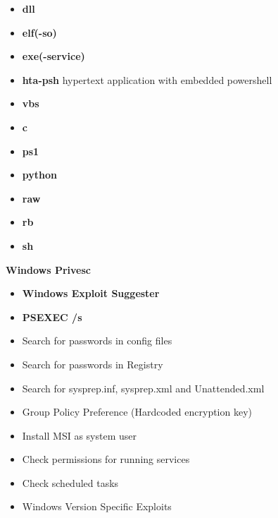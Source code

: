 \documentclass[a4paper,10pt]{article}
\begin{document}
\begin{multicols}{2}
\begin{tcolorbox}[breakable,title=Payload Generation]
\begin{itemize}
	\item \textbf{dll}
	\item \textbf{elf(-so)}
	\item \textbf{exe(-service)}
	\item \textbf{hta-psh} hypertext application with embedded powershell
	\item \textbf{vbs}
	\item \textbf{c}
	\item \textbf{ps1}
	\item \textbf{python}
	\item \textbf{raw}
	\item \textbf{rb}
	\item \textbf{sh}
\end{itemize}
\end{tcolorbox}
\end{multicols}
\newpage
\Huge{\textbf{Windows Privesc}}
\newline
\normalsize
\begin{tcolorbox}[breakable,title=Generic]
\begin{itemize}
	\itemsep0em
	\item \textbf{Windows Exploit Suggester}
	\item \textbf{PSEXEC /s}
	\item Search for passwords in config files
	\item Search for passwords in Registry
	\item Search for sysprep.inf, sysprep.xml and Unattended.xml
	\item Group Policy Preference (Hardcoded encryption key)
	\item Install MSI as system user
	\item Check permissions for running services
	\item Check scheduled tasks
	\item Windows Version Specific Exploits
\end{itemize}
\end{tcolorbox}
\end{document}
